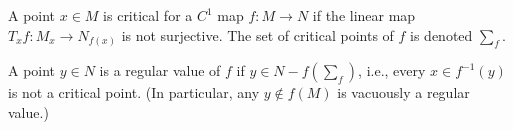 A point $x \in M$ is critical for a $C^1$ map $f: M \to N$ if the linear map $T_x f: M_x \to N_{f(x)}$ is not surjective. The set of critical points of $f$ is denoted $\sum_f$.

A point $y \in N$ is a regular value of $f$ if $y \in N - f(\sum_f)$, i.e., every $x \in f^{-1}(y)$ is not a critical point. (In particular, any $y \notin f(M)$ is vacuously a regular value.)
